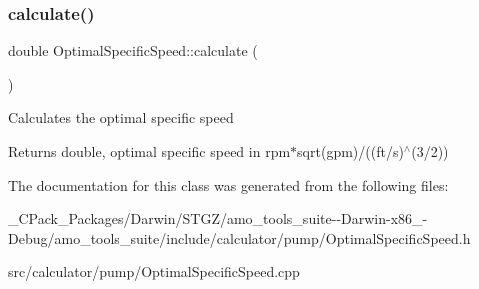 \subsubsection{\texorpdfstring{calculate()}{calculate()}\hspace{0.1cm}{\footnotesize\ttfamily [3/3]}}
{\footnotesize\ttfamily double Optimal\+Specific\+Speed\+::calculate (\begin{DoxyParamCaption}{ }\end{DoxyParamCaption})}

Calculates the optimal specific speed \begin{DoxyReturn}{Returns}
double, optimal specific speed in rpm$\ast$sqrt(gpm)/((ft/s)$^\wedge$(3/2)) 
\end{DoxyReturn}


The documentation for this class was generated from the following files\+:\begin{DoxyCompactItemize}
\item 
\+\_\+\+C\+Pack\+\_\+\+Packages/\+Darwin/\+S\+T\+G\+Z/amo\+\_\+tools\+\_\+suite-\/-\/\+Darwin-\/x86\+\_-\/\+Debug/amo\+\_\+tools\+\_\+suite/include/calculator/pump/Optimal\+Specific\+Speed.\+h\item 
src/calculator/pump/Optimal\+Specific\+Speed.\+cpp\end{DoxyCompactItemize}
